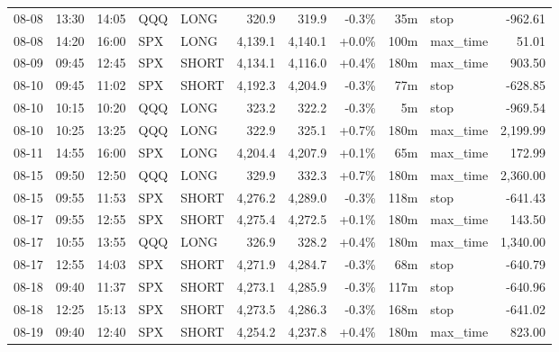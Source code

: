 \documentclass[11pt,a4paper,twoside]{article}
\begin{document}
\begin{center}
\begin{longtable}{>{\color{txtmain}}l l l l l r r r r >{\color{txtmain}}l r}
08-08 & 13:30 & 14:05 & QQQ & LONG & 320.9 & 319.9 & \textcolor{lossred}{-0.3\%} & 35m & stop & \textcolor{lossred}{-962.61} \\
08-08 & 14:20 & 16:00 & SPX & LONG & 4,139.1 & 4,140.1 & \textcolor{wingreen}{+0.0\%} & 100m & max\_time & \textcolor{wingreen}{51.01} \\
08-09 & 09:45 & 12:45 & SPX & SHORT & 4,134.1 & 4,116.0 & \textcolor{wingreen}{+0.4\%} & 180m & max\_time & \textcolor{wingreen}{903.50} \\
08-10 & 09:45 & 11:02 & SPX & SHORT & 4,192.3 & 4,204.9 & \textcolor{lossred}{-0.3\%} & 77m & stop & \textcolor{lossred}{-628.85} \\
08-10 & 10:15 & 10:20 & QQQ & LONG & 323.2 & 322.2 & \textcolor{lossred}{-0.3\%} & 5m & stop & \textcolor{lossred}{-969.54} \\
08-10 & 10:25 & 13:25 & QQQ & LONG & 322.9 & 325.1 & \textcolor{wingreen}{+0.7\%} & 180m & max\_time & \textcolor{wingreen}{2,199.99} \\
08-11 & 14:55 & 16:00 & SPX & LONG & 4,204.4 & 4,207.9 & \textcolor{wingreen}{+0.1\%} & 65m & max\_time & \textcolor{wingreen}{172.99} \\
08-15 & 09:50 & 12:50 & QQQ & LONG & 329.9 & 332.3 & \textcolor{wingreen}{+0.7\%} & 180m & max\_time & \textcolor{wingreen}{2,360.00} \\
08-15 & 09:55 & 11:53 & SPX & SHORT & 4,276.2 & 4,289.0 & \textcolor{lossred}{-0.3\%} & 118m & stop & \textcolor{lossred}{-641.43} \\
08-17 & 09:55 & 12:55 & SPX & SHORT & 4,275.4 & 4,272.5 & \textcolor{wingreen}{+0.1\%} & 180m & max\_time & \textcolor{wingreen}{143.50} \\
08-17 & 10:55 & 13:55 & QQQ & LONG & 326.9 & 328.2 & \textcolor{wingreen}{+0.4\%} & 180m & max\_time & \textcolor{wingreen}{1,340.00} \\
08-17 & 12:55 & 14:03 & SPX & SHORT & 4,271.9 & 4,284.7 & \textcolor{lossred}{-0.3\%} & 68m & stop & \textcolor{lossred}{-640.79} \\
08-18 & 09:40 & 11:37 & SPX & SHORT & 4,273.1 & 4,285.9 & \textcolor{lossred}{-0.3\%} & 117m & stop & \textcolor{lossred}{-640.96} \\
08-18 & 12:25 & 15:13 & SPX & SHORT & 4,273.5 & 4,286.3 & \textcolor{lossred}{-0.3\%} & 168m & stop & \textcolor{lossred}{-641.02} \\
08-19 & 09:40 & 12:40 & SPX & SHORT & 4,254.2 & 4,237.8 & \textcolor{wingreen}{+0.4\%} & 180m & max\_time & \textcolor{wingreen}{823.00} \\

\end{longtable}
\end{center}
\end{document}
